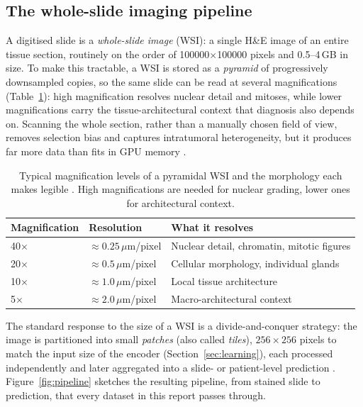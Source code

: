 \documentclass[11pt]{article}
\begin{document}
\subsection{The whole-slide imaging pipeline}
\label{sec:pipeline}
A digitised slide is a \emph{whole-slide image} (WSI): a single H\&E image of an entire tissue
section, routinely on the order of \num{100000}$\times$\num{100000} pixels and \num{0.5}--\num{4}\,GB
in size. To make this tractable, a WSI is
stored as a \emph{pyramid} of progressively downsampled copies, so the same slide can be read at
several magnifications (Table~\ref{tab:magnification}): high magnification resolves nuclear detail
and mitoses, while lower magnifications carry the tissue-architectural context that diagnosis also
depends on. Scanning the whole section, rather than a manually chosen field of view, removes
selection bias and captures intratumoral heterogeneity, but it produces far more data than fits in
GPU memory \citep{song2023aiPathology,abels2019computationalPathology}.

\begin{table}[ht]
  \centering
  \small
  \begin{tabularx}{\linewidth}{@{}llX@{}}
    \toprule
    Magnification & Resolution & What it resolves\\
    \midrule
    \num{40}$\times$ & ${\approx}\num{0.25}\,\mu$m/pixel & Nuclear detail, chromatin, mitotic figures\\
    \num{20}$\times$ & ${\approx}\num{0.5}\,\mu$m/pixel  & Cellular morphology, individual glands\\
    \num{10}$\times$ & ${\approx}\num{1.0}\,\mu$m/pixel  & Local tissue architecture\\
    \num{5}$\times$  & ${\approx}\num{2.0}\,\mu$m/pixel  & Macro-architectural context\\
    \bottomrule
  \end{tabularx}
  \caption{Typical magnification levels of a pyramidal WSI and the morphology each makes legible
  \citep{song2023aiPathology}. High magnifications are needed for nuclear grading, lower ones for
  architectural context.}
  \label{tab:magnification}
\end{table}

The standard response to the size of a WSI is a divide-and-conquer strategy: the image is
partitioned into small \emph{patches} (also called \emph{tiles}), $256\times256$ pixels to match the
input size of the encoder (Section~\ref{sec:learning}), each processed
independently and later aggregated into a slide- or patient-level prediction
\citep{song2023aiPathology}. Figure~\ref{fig:pipeline} sketches the resulting pipeline, from stained
slide to prediction, that every dataset in this report passes through.
\end{document}
